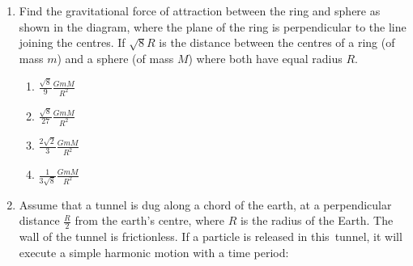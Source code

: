 \documentclass[journal]{IEEEtran}
\begin{document}
\begin{enumerate}
    \begin{multicols}{4}
    \begin{enumerate}
        \item $\frac{3R}{2}$
        \item $\frac{R}{2}$
        \item $R$
        \item $2R$
    \end{enumerate}
    \end{multicols}

    \item Find the gravitational force of attraction between the ring and sphere as
    shown in the diagram, where the plane of the ring is perpendicular to the line
    joining the centres. If $\sqrt{8}R$ is the distance between the centres of a
    ring (of mass $m$) and a sphere (of mass $M$) where both have equal radius $R$.

    \begin{center}
    \end{center}

    \begin{multicols}{4}
    \begin{enumerate}
        \item $\frac{\sqrt{8}}{9} \frac{GmM}{R^2}$
        \item $\frac{\sqrt{8}}{27} \frac{GmM}{R^2}$
        \item $\frac{2\sqrt{2}}{3} \frac{GmM}{R^2}$
        \item $\frac{1}{3\sqrt{8}} \frac{GmM}{R^2}$
    \end{enumerate}
    \end{multicols}

    \item Assume that a tunnel is dug along a chord of the earth, at a perpendicular
    distance $\frac{R}{2}$ from the earth's centre, where $R$ is the radius of the
    Earth. The wall of the tunnel is frictionless. If a particle is released in this\
    tunnel, it will execute a simple harmonic motion with a time period:
 

\end{enumerate}
\end{document}
